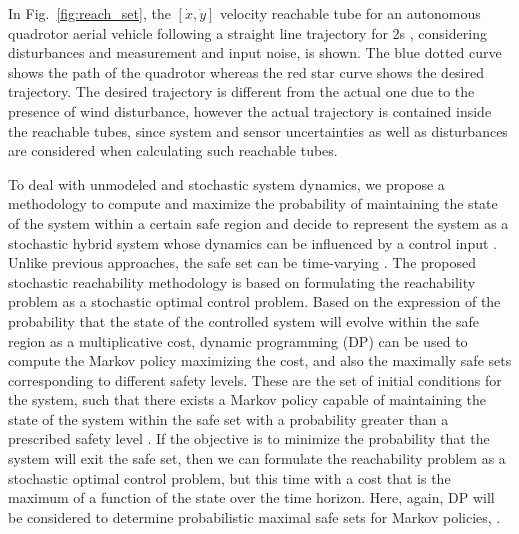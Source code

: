 In Fig.~\ref{fig:reach_set}, the $[\dot x, \dot y]$ velocity reachable tube for an autonomous quadrotor aerial vehicle following a straight line trajectory for 2s , considering disturbances and measurement and input noise, is shown. 
The blue dotted curve shows the path of the quadrotor whereas the red star curve shows the desired trajectory. The desired trajectory is different from the actual one due to the presence of wind disturbance, however the actual trajectory is contained inside the reachable tubes, since system and sensor uncertainties as well as disturbances are considered when calculating such reachable tubes.

To deal with unmodeled and stochastic system dynamics, we propose a methodology to compute and maximize the probability of maintaining the state of the system within a certain safe region and decide to represent the system as a stochastic hybrid system whose dynamics can be influenced by a control input \cite{abate2007probabilistic, vinod2017forward}. Unlike previous approaches, the safe set can be time-varying \cite{bertsekas1972infinite, bicchi2005control}.
The proposed stochastic reachability methodology is based on formulating the reachability problem as a stochastic optimal control problem. Based on the expression of the probability that the state of the controlled system will evolve within the safe region as a multiplicative cost, dynamic programming (DP) can be used to compute the Markov policy maximizing the cost, and also the maximally safe sets corresponding to different safety levels. 
These are the set of initial conditions for the system, such that there exists a Markov policy capable of maintaining the state of the system within the safe set with a probability greater than a prescribed safety level \cite{tomlin1998synthesizing, balluchi2000maximal,abate2007probabilistic}.
If the objective is to minimize the probability that the system will exit the safe set, then we can formulate the reachability problem as a stochastic optimal control problem, but this time with a cost that is the maximum of a function of the state over the time horizon. Here, again, DP will be considered to determine probabilistic maximal safe sets for Markov policies, \cite{abate2007probabilistic}.



